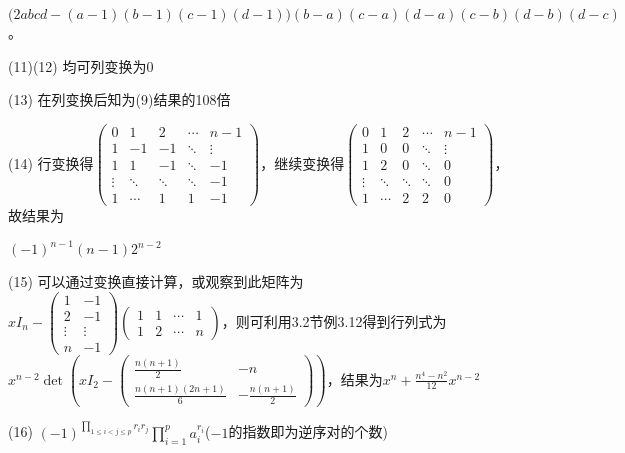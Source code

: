 \documentclass[a4paper,UTF8,fontset=windows]{ctexart}
\begin{document}
\begin{enumerate}
$\big(2abcd-(a-1)(b-1)(c-1)(d-1)\big)(b-a)(c-a)(d-a)(c-b)(d-b)(d-c)$。

(11)(12) 均可列变换为0

(13) 在列变换后知为(9)结果的108倍

(14) 行变换得$\begin{pmatrix}0&1&2&\cdots&n-1\\1&-1&-1&\ddots&\vdots\\1&1&-1&\ddots&-1\\\vdots&\ddots&\ddots&\ddots&-1\\1&\cdots&1&1&-1\end{pmatrix}$，继续变换得$\begin{pmatrix}0&1&2&\cdots&n-1\\1&0&0&\ddots&\vdots\\1&2&0&\ddots&0\\\vdots&\ddots&\ddots&\ddots&0\\1&\cdots&2&2&0\end{pmatrix}$，故结果为

$(-1)^{n-1}(n-1)2^{n-2}$

(15) 可以通过变换直接计算，或观察到此矩阵为$xI_n-\begin{pmatrix}1&-1\\2&-1\\\vdots&\vdots\\n&-1\end{pmatrix}\begin{pmatrix}1&1&\cdots&1\\1&2&\cdots&n\end{pmatrix}$，则可利用3.2节例3.12得到行列式为$x^{n-2}\det\left(xI_2-\begin{pmatrix}\frac{n(n+1)}{2}&-n\\\frac{n(n+1)(2n+1)}{6}&-\frac{n(n+1)}{2}\end{pmatrix}\right)$，结果为$x^n+\frac{n^4-n^2}{12}x^{n-2}$

(16) $(-1)^{\prod_{1\le i<j\le p} r_ir_j}\prod_{i=1}^{p}a_i^{r_i}$($-1$的指数即为逆序对的个数)
\end{enumerate}
\end{document}
